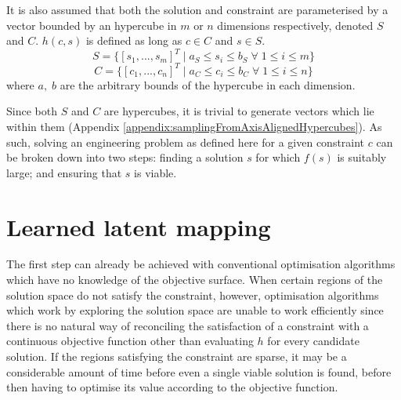 \documentclass[../../main.tex]{subfiles}
\begin{document}
It is also assumed that both the solution and constraint are parameterised by a vector bounded by an hypercube in $m$ or $n$ dimensions respectively, denoted $S$ and $C$.
$h(c,s)$ is defined as long as $c\in C$ and $s\in S$.
\begin{equation}
    S=\{[s_1,...,s_m]^T\;|\;a_S\le s_i\le b_S\;\forall\;1\le i\le m\}
\end{equation}
\begin{equation}
    C=\{[c_1,...,c_n]^T\;|\;a_C\le c_i\le b_C\;\forall\;1\le i\le n\}
\end{equation}
where $a,\;b$ are the arbitrary bounds of the hypercube in each dimension.

Since both $S$ and $C$ are hypercubes, it is trivial to generate vectors which lie within them (Appendix \ref{appendix:samplingFromAxisAlignedHypercubes}).
As such, solving an engineering problem as defined here for a given constraint $c$ can be broken down into two steps: finding a solution $s$ for which $f(s)$ is suitably large; and ensuring that $s$ is viable.

\section{Learned latent mapping} \label{section:learnedLatentMapping}

The first step can already be achieved with conventional optimisation algorithms which have no knowledge of the objective surface.
When certain regions of the solution space do not satisfy the constraint, however, optimisation algorithms which work by exploring the solution space are unable to work efficiently since there is no natural way of reconciling the satisfaction of a constraint with a continuous objective function other than evaluating $h$ for every candidate solution.
If the regions satisfying the constraint are sparse, it may be a considerable amount of time before even a single viable solution is found, before then having to optimise its value according to the objective function.
\end{document}
